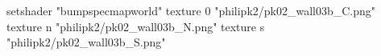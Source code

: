 setshader "bumpspecmapworld"
    texture 0 "philipk2/pk02_wall03b_C.png"
    texture n "philipk2/pk02_wall03b_N.png"
    texture s "philipk2/pk02_wall03b_S.png"